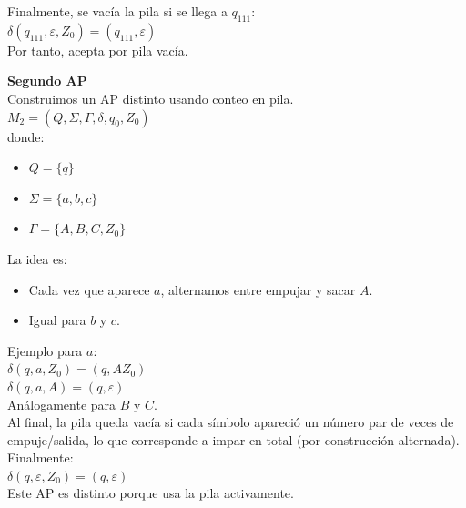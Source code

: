 \documentclass[12pt]{article}
\newcommand{\Pspace}{0.5cm}
\begin{document}
{        Finalmente, se vacía la pila si se llega a $q_{111}$: \\
        $\delta (q_{111}, \varepsilon, Z_{0}) = (q_{111}, \varepsilon)$ \\
        Por tanto, acepta por pila vacía. \\

        \vspace{\Pspace}

        \textbf{Segundo AP} \\
        Construimos un AP distinto usando conteo en pila. \\
        $M_2 = (Q, \Sigma, \Gamma, \delta, q_0, Z_{0})$ \\
        donde:
        \begin{itemize}
            \item $Q = \{ q \}$

            \item $\Sigma = \{ a, b, c \}$

            \item $\Gamma = \{ A, B, C, Z_{0} \}$
        \end{itemize}
        
        La idea es:
        \begin{itemize}
            \item Cada vez que aparece $a$, alternamos entre empujar y sacar $A$.

            \item Igual para $b$ y $c$.
        \end{itemize}

        \newpage
        Ejemplo para $a$: \\
        $\delta (q, a, Z_{0}) = (q, AZ_0)$ \\
        $\delta (q, a, A) = (q, \varepsilon)$ \\

        Análogamente para $B$ y $C$. \\
        Al final, la pila queda vacía si cada símbolo apareció un número par de veces de empuje/salida,
        lo que corresponde a impar en total (por construcción alternada). \\
        Finalmente: \\
        $\delta (q, \varepsilon, Z_0) = (q, \varepsilon)$ \\
        Este AP es distinto porque usa la pila activamente.
    }



\end{document}
